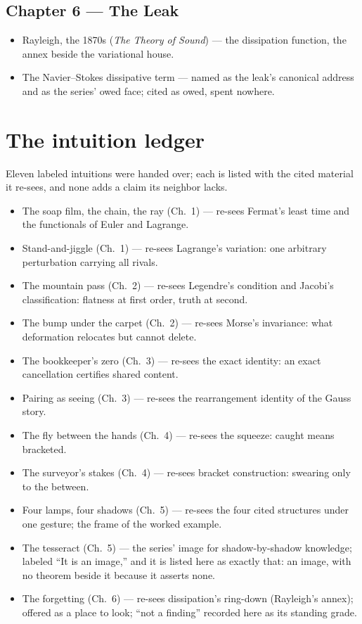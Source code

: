 \subsection*{Chapter 6 --- The Leak}
\begin{itemize}
\item Rayleigh, the 1870s (\emph{The Theory of Sound}) --- the
dissipation function, the annex beside the variational house.
\item The Navier--Stokes dissipative term --- named as the leak's
canonical address and as the series' owed face; cited as owed, spent
nowhere.
\end{itemize}

\section*{The intuition ledger}

Eleven labeled intuitions were handed over; each is listed with the
cited material it re-sees, and none adds a claim its neighbor lacks.

\begin{itemize}
\item[I1.] The soap film, the chain, the ray (Ch.~1) --- re-sees
Fermat's least time and the functionals of Euler and Lagrange.
\item[I2.] Stand-and-jiggle (Ch.~1) --- re-sees Lagrange's variation:
one arbitrary perturbation carrying all rivals.
\item[I3.] The mountain pass (Ch.~2) --- re-sees Legendre's condition
and Jacobi's classification: flatness at first order, truth at second.
\item[I4.] The bump under the carpet (Ch.~2) --- re-sees Morse's
invariance: what deformation relocates but cannot delete.
\item[I5.] The bookkeeper's zero (Ch.~3) --- re-sees the exact identity:
an exact cancellation certifies shared content.
\item[I6.] Pairing as seeing (Ch.~3) --- re-sees the rearrangement
identity of the Gauss story.
\item[I7.] The fly between the hands (Ch.~4) --- re-sees the squeeze:
caught means bracketed.
\item[I8.] The surveyor's stakes (Ch.~4) --- re-sees bracket
construction: swearing only to the between.
\item[I9.] Four lamps, four shadows (Ch.~5) --- re-sees the four cited
structures under one gesture; the frame of the worked example.
\item[I10.] The tesseract (Ch.~5) --- the series' image for
shadow-by-shadow knowledge; labeled ``It is an image,'' and it is
listed here as exactly that: an image, with no theorem beside it
because it asserts none.
\item[I11.] The forgetting (Ch.~6) --- re-sees dissipation's ring-down
(Rayleigh's annex); offered as a place to look; ``not a finding''
recorded here as its standing grade.
\end{itemize}

